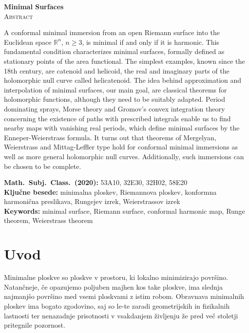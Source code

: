 \documentclass[12pt,a4paper,twoside]{article}
\newcommand{\kljucnebesede}{minimalna ploskev\sep Riemannova ploskev\sep konformna harmonična preslikava\sep Rungejev izrek\sep Weierstrassov izrek} %
\newcommand{\keywords}{minimal surface\sep Riemann surface\sep conformal harmonic map\sep Runge theorem\sep Weierstrass theorem} %
\newcommand{\sep}{, }  %
\theoremstyle{definition} %
\theoremstyle{plain} %
\numberwithin{equation}{section}  %
\newcommand{\R}{\mathbb R}
\begin{document}
\vfill
\begin{center}
\textbf{Minimal Surfaces} \\[3mm] %
\textsc{Abstract}\\[2mm]
\end{center}
A conformal minimal immersion from an open Riemann surface into the Euclidean space $\R^{n}$, $n \geq 3$, is minimal if and only if it is harmonic. This fundamental condition characterizes minimal surfaces, formally defined as stationary points of the area functional. The simplest examples, known since the 18th century, are catenoid and helicoid, the real and imaginary parts of the holomorphic null curve called helicatenoid. The idea behind approximation and interpolation of minimal surfaces, our main goal, are classical theorems for holomorphic functions, although they need to be suitably adapted. Period dominating sprays, Morse theory and Gromov’s convex integration theory concerning the existence of paths with prescribed integrals enable us to find nearby maps with vanishing real periods, which define minimal surfaces by the Enneper-Weierstrass formula. It turns out that theorems of Mergelyan, Weierstrass and Mittag-Leffler type hold for conformal minimal immersions as well as more general holomorphic null curves. Additionally, such immersions can be chosen to be complete. 

\vfill\noindent
\textbf{Math.~Subj.~Class.~(2020):} 53A10, 32E30, 32H02, 58E20 \\[1mm]
\textbf{Ključne besede:} \kljucnebesede \\[1mm]
\textbf{Keywords:} \keywords

\cleardoublepage

\setcounter{page}{1}    %

\section{Uvod}

Minimalne ploskve so ploskve v prostoru, ki lokalno minimizirajo površino. Natančneje, če opazujemo poljuben majhen kos take ploskve, ima slednja najmanjšo površino med vsemi ploskvami z istim robom.
Obravnava minimalnih ploskev ima bogato zgodovino, saj so le-te zaradi geometrijskih in fizikalnih lastnosti ter nenazadnje prisotnosti v vsakdanjem življenju že pred več stoletji pritegnile pozornost.
\end{document}
